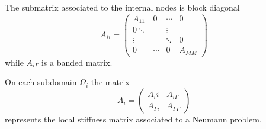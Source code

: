 The submatrix associated to the internal nodes is block diagonal 
\[
    A_{ii} = \left( \begin{matrix}
        A_{11} & 0 & \cdots & 0 \\
        0 \ddots & & \vdots \\
        \vdots & & \ddots & 0 \\
        0 & \cdots & 0 & A_{MM} 
    \end{matrix} \right)
\]
while \(A_{i\Gamma}\) is a banded matrix.
\begin{remark}
    On each subdomain \(\Omega_i\) the matrix 
    \[
        A_i = \left( \begin{matrix}
            A_ii & A_{i \Gamma } \\
            A_{\Gamma i} & A_{\Gamma\Gamma}
        \end{matrix} \right)
    \]
    represents the local stiffness matrix associated to a Neumann problem.
\end{remark}
